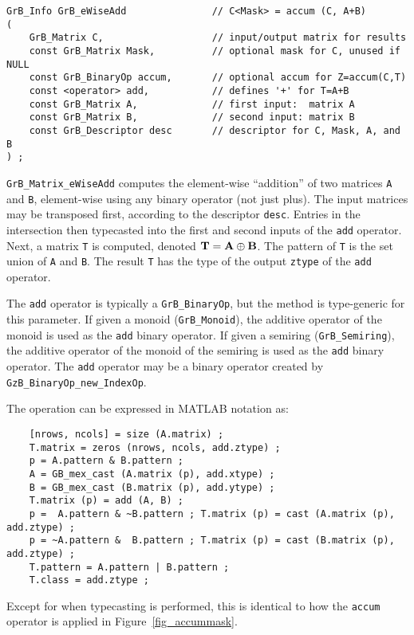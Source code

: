 \documentclass[12pt]{article}
\begin{document}
\begin{mdframed}[userdefinedwidth=6in]
{\footnotesize
\begin{verbatim}
GrB_Info GrB_eWiseAdd               // C<Mask> = accum (C, A+B)
(
    GrB_Matrix C,                   // input/output matrix for results
    const GrB_Matrix Mask,          // optional mask for C, unused if NULL
    const GrB_BinaryOp accum,       // optional accum for Z=accum(C,T)
    const <operator> add,           // defines '+' for T=A+B
    const GrB_Matrix A,             // first input:  matrix A
    const GrB_Matrix B,             // second input: matrix B
    const GrB_Descriptor desc       // descriptor for C, Mask, A, and B
) ;
\end{verbatim} } \end{mdframed}

\verb'GrB_Matrix_eWiseAdd' computes the element-wise ``addition'' of two
matrices \verb'A' and \verb'B', element-wise using any binary operator (not
just plus).  The input matrices may be transposed first, according to the
descriptor \verb'desc'.  Entries in the intersection then typecasted into the
first and second inputs of the \verb'add' operator.  Next, a matrix \verb'T' is
computed, denoted ${\bf T = A \oplus B}$.  The pattern of \verb'T' is the set
union of \verb'A' and \verb'B'.  The result \verb'T' has the type of the output
\verb'ztype' of the \verb'add' operator.

The \verb'add' operator is typically a \verb'GrB_BinaryOp', but the method is
type-generic for this parameter.  If given a monoid (\verb'GrB_Monoid'), the
additive operator of the monoid is used as the \verb'add' binary operator.  If
given a semiring (\verb'GrB_Semiring'), the additive operator of the monoid of
the semiring is used as the \verb'add' binary operator.
%
The \verb'add' operator may be a binary operator
created by \verb'GzB_BinaryOp_new_IndexOp'.

\vspace{0.05in}
The operation can be expressed in MATLAB notation as:
    {\footnotesize
    \begin{verbatim}
    [nrows, ncols] = size (A.matrix) ;
    T.matrix = zeros (nrows, ncols, add.ztype) ;
    p = A.pattern & B.pattern ;
    A = GB_mex_cast (A.matrix (p), add.xtype) ;
    B = GB_mex_cast (B.matrix (p), add.ytype) ;
    T.matrix (p) = add (A, B) ;
    p =  A.pattern & ~B.pattern ; T.matrix (p) = cast (A.matrix (p), add.ztype) ;
    p = ~A.pattern &  B.pattern ; T.matrix (p) = cast (B.matrix (p), add.ztype) ;
    T.pattern = A.pattern | B.pattern ;
    T.class = add.ztype ; \end{verbatim} }
Except for when typecasting is performed, this is identical to how the
\verb'accum' operator is applied in Figure~\ref{fig_accummask}.
\end{document}
